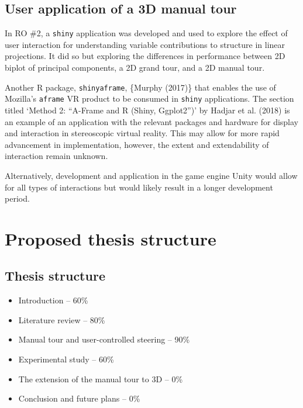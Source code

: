 \documentclass[
  11,
]{article}
\providecommand{\tightlist}{%
  \setlength{\itemsep}{0pt}\setlength{\parskip}{0pt}}
\begin{document}
\hypertarget{user-application-of-a-3d-manual-tour}{%
\subsection{User application of a 3D manual tour}\label{user-application-of-a-3d-manual-tour}}

In RO \#2, a \texttt{shiny} application was developed and used to explore the effect of user interaction for understanding variable contributions to structure in linear projections. It did so but exploring the differences in performance between 2D biplot of principal components, a 2D grand tour, and a 2D manual tour.

Another R package, \texttt{shinyaframe}, \{Murphy (2017)\} that enables the use of Mozilla's \texttt{aframe} VR product to be consumed in \texttt{shiny} applications. The section titled `Method 2: ``A-Frame and R (Shiny, Ggplot2'')' by Hadjar et al. (2018) is an example of an application with the relevant packages and hardware for display and interaction in stereoscopic virtual reality. This may allow for more rapid advancement in implementation, however, the extent and extendability of interaction remain unknown.

Alternatively, development and application in the game engine Unity would allow for all types of interactions but would likely result in a longer development period.

\hypertarget{proposed-thesis-structure}{%
\section{Proposed thesis structure}\label{proposed-thesis-structure}}

\hypertarget{thesis-structure}{%
\subsection{Thesis structure}\label{thesis-structure}}

\begin{itemize}
\tightlist
\item
  Introduction -- 60\%
\item
  Literature review -- 80\%
\item
  Manual tour and user-controlled steering -- 90\%
\item
  Experimental study -- 60\%
\item
  The extension of the manual tour to 3D -- 0\%
\item
  Conclusion and future plans -- 0\%
\end{itemize}
\end{document}
